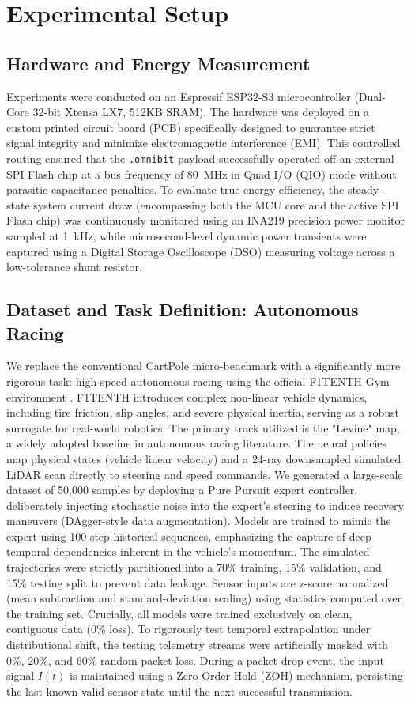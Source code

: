 \documentclass[conference]{IEEEtran}
\begin{document}
\section{Experimental Setup}

\subsection{Hardware and Energy Measurement}
Experiments were conducted on an Espressif ESP32-S3 microcontroller (Dual-Core 32-bit Xtensa LX7, 512KB SRAM). The hardware was deployed on a custom printed circuit board (PCB) specifically designed to guarantee strict signal integrity and minimize electromagnetic interference (EMI). This controlled routing ensured that the \texttt{.omnibit} payload successfully operated off an external SPI Flash chip at a bus frequency of 80~MHz in Quad I/O (QIO) mode without parasitic capacitance penalties. To evaluate true energy efficiency, the steady-state system current draw (encompassing both the MCU core and the active SPI Flash chip) was continuously monitored using an INA219 precision power monitor sampled at 1~kHz, while microsecond-level dynamic power transients were captured using a Digital Storage Oscilloscope (DSO) measuring voltage across a low-tolerance shunt resistor.

\subsection{Dataset and Task Definition: Autonomous Racing}
We replace the conventional CartPole micro-benchmark with a significantly more rigorous task: high-speed autonomous racing using the official F1TENTH Gym environment \cite{okelly2020f1tenth}. F1TENTH introduces complex non-linear vehicle dynamics, including tire friction, slip angles, and severe physical inertia, serving as a robust surrogate for real-world robotics. The primary track utilized is the "Levine" map, a widely adopted baseline in autonomous racing literature. The neural policies map physical states (vehicle linear velocity) and a 24-ray downsampled simulated LiDAR scan directly to steering and speed commands. We generated a large-scale dataset of 50,000 samples by deploying a Pure Pursuit expert controller, deliberately injecting stochastic noise into the expert's steering to induce recovery maneuvers (DAgger-style data augmentation). Models are trained to mimic the expert using 100-step historical sequences, emphasizing the capture of deep temporal dependencies inherent in the vehicle's momentum. The simulated trajectories were strictly partitioned into a 70\% training, 15\% validation, and 15\% testing split to prevent data leakage. Sensor inputs are z-score normalized (mean subtraction and standard-deviation scaling) using statistics computed over the training set. Crucially, all models were trained exclusively on clean, contiguous data (0\% loss). To rigorously test temporal extrapolation under distributional shift, the testing telemetry streams were artificially masked with $0\%$, $20\%$, and $60\%$ random packet loss. During a packet drop event, the input signal $I(t)$ is maintained using a Zero-Order Hold (ZOH) mechanism, persisting the last known valid sensor state until the next successful transmission.
\end{document}
